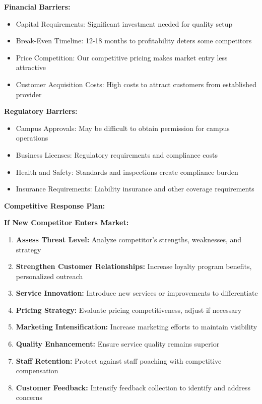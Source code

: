 \textbf{Financial Barriers:}
\begin{itemize}[leftmargin=2em]
    \item Capital Requirements: Significant investment needed for quality setup
    \item Break-Even Timeline: 12-18 months to profitability deters some competitors
    \item Price Competition: Our competitive pricing makes market entry less attractive
    \item Customer Acquisition Costs: High costs to attract customers from established provider
\end{itemize}

\textbf{Regulatory Barriers:}
\begin{itemize}[leftmargin=2em]
    \item Campus Approvals: May be difficult to obtain permission for campus operations
    \item Business Licenses: Regulatory requirements and compliance costs
    \item Health and Safety: Standards and inspections create compliance burden
    \item Insurance Requirements: Liability insurance and other coverage requirements
\end{itemize}

\vspace{1em}

\textbf{Competitive Response Plan:}

\textbf{If New Competitor Enters Market:}
\begin{enumerate}[leftmargin=2em]
    \item \textbf{Assess Threat Level:} Analyze competitor's strengths, weaknesses, and strategy
    \item \textbf{Strengthen Customer Relationships:} Increase loyalty program benefits, personalized outreach
    \item \textbf{Service Innovation:} Introduce new services or improvements to differentiate
    \item \textbf{Pricing Strategy:} Evaluate pricing competitiveness, adjust if necessary
    \item \textbf{Marketing Intensification:} Increase marketing efforts to maintain visibility
    \item \textbf{Quality Enhancement:} Ensure service quality remains superior
    \item \textbf{Staff Retention:} Protect against staff poaching with competitive compensation
    \item \textbf{Customer Feedback:} Intensify feedback collection to identify and address concerns
\end{enumerate}

